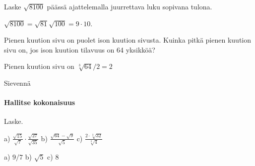 \begin{tehtavasivu}
\begin{tehtava}
Laske $\sqrt{8100}$ päässä ajattelemalla juurrettava luku sopivana tulona.
\begin{vastaus}
$\sqrt{8100}=\sqrt{81}\sqrt{100}=9\cdot 10$.
\end{vastaus}
\end{tehtava}





\begin{tehtava}
Pienen kuution sivu on puolet ison kuution sivusta. Kuinka pitkä pienen kuution sivu on, jos ison kuution tilavuus on 64 yksikköä? \\
\begin{vastaus}
Pienen kuution sivu on $\sqrt[3]{64}/2=2$ 
\end{vastaus}
\end{tehtava}



\begin{tehtava}
 Sievennä
	\begin{alakohdat}
	\end{alakohdat}
	  \begin{vastaus}
		\begin{alakohdat}
		 \alakohta{$\sqrt{3}$}
		 \alakohta{$\sqrt[3]{2}$}
		 \alakohta{${\sqrt[60]{42}}^{11}$}
		\end{alakohdat}
	\end{vastaus}
\end{tehtava}



\paragraph*{Hallitse kokonaisuus}

Laske.

\begin{tehtava}
a) $ \frac{\sqrt{15}}{\sqrt{7}} \cdot  \frac{\sqrt{27}}{\sqrt{35}}$  \quad b)  $ \frac{\sqrt{64}-\sqrt{9}}{\sqrt{5}}$   \quad c)  $ \frac{2 \cdot \sqrt[3]{32}}{\sqrt[3]{4}}$ \quad 
\begin{vastaus}
a) $9/7$ \quad b) $\sqrt{5}$ \quad c) $8$ \quad
\end{vastaus}
\end{tehtava}


\end{tehtavasivu}
